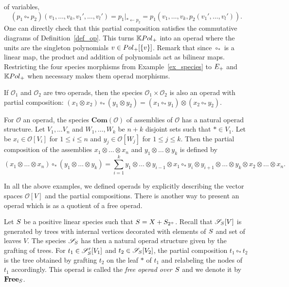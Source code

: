 \documentclass[11pt]{article}
\theoremstyle{definition}
\numberwithin{equation}{section}
\newcommand{\take}{\leftarrow}
\newcommand{\set}[1]{\left\{#1\right\}}
\newcommand{\spe}[1]{\normalfont{\textsc{#1}}}
\newcommand{\op}[1]{\mathbf{#1}}
\newcommand{\K}{\mathbb{K}}
\newcommand{\comp}[1][\ast]{\circ_{#1}}
\newcommand{\Poly}{\spe{Pol}_+}
\newcommand{\stree}[1]{\mathscr{S}_{{#1}}}
\newcommand{\Sym}{\spe{E}}
\newcommand{\Operad}{\mathcal{O}}
\newcommand{\Com}{\op{Com}}
\newcommand{\free}[1]{\op{Free}_{#1}}
\begin{document}
\begin{description}
    of variables,
    \begin{equation}\label{pol_composition}
        (p_1\comp p_2)(v_1,\dots,v_k,v_1',\dots,v_l') = p_1|_{\ast \take p_2}
        = p_1(v_1,\dots, v_{k},p_2(v_1',\dots,v_l')).
    \end{equation}
    One can directly check that this partial composition satisfies the commutative diagrams of
    Definition~\ref{def_op}. This turns $\K\Poly$ into an operad where the units are the singleton 
    polynomials $v\in\Poly[\set{v}]$. Remark that since $\comp$ is a linear map, the product and
    addition of polynomials act as bilinear maps. Restricting the four species morphisms from 
    Example~\ref{ex_species} to $\Sym_+$ and $\K\Poly$ when necessary makes them operad morphisms.
    
    \item[Hadamard product.] If $\Operad_1$ and $\Operad_2$ are two operads, then the species 
    $\Operad_1\times\Operad_2$ is also an operad with partial composition: 
    $(x_1\otimes x_2)\comp (y_1\otimes y_2) =(x_1\comp y_1)\otimes (x_2\comp y_2)$. 
    
    \item[Assemblies.] For $\Operad$ an operad, the species $\Com(\Operad)$ of assemblies of $\Operad$ has 
    a natural operad structure. Let $V_1,\dots V_n$ and $W_1,\dots, W_k$ be $n+k$ disjoint sets such that 
    $\ast\in V_1$. Let be $x_i\in \Operad[V_i]$ for $1\leq i\leq n$ and $y_j\in\Operad[W_j]$ for 
    $1\leq j\leq k$.
    Then the partial composition of the assemblies $x_1\otimes\dots\otimes x_n$ and 
    $y_1\otimes\dots\otimes y_k$ is defined by
    $$(x_1\otimes\dots\otimes x_n) \comp (y_1\otimes\dots\otimes y_k) 
    = \sum_{i=1}^k y_1\otimes\dots\otimes y_{i-1}\otimes x_1\comp y_i \otimes y_{i+1}\otimes\dots\otimes y_k \otimes x_2\otimes\dots\otimes x_n.$$
\end{description}

In all the above examples, we defined operads by explicitly describing the vector spaces $\Operad[V]$ and 
the partial compositions. There is another way to present an operad which is as a quotient of a free operad.

Let $\spe{S}$ be a positive linear species such that $\spe{S}=\spe{X}+\spe{S}_{2^+}$. Recall that 
$\stree{\spe{S}}[V]$ is generated by trees with internal vertices decorated with elements of $\spe{S}$ 
and set of leaves $V$.
The species $\stree{\spe{S}}$ has then a natural operad structure given by the grafting of trees. For 
$t_1\in\stree{\spe{S}}'[V_1]$ and $t_2\in\stree{\spe{S}}[V_2]$, the partial composition $t_1\comp t_2$ is 
the tree obtained by grafting $t_2$ on the leaf $\ast$ of $t_1$ and relabeling the nodes of $t_1$ accordingly. 
This operad is called the {\em free operad over $\spe{S}$} and we denote it by $\free{\spe{S}}$.
\end{document}
